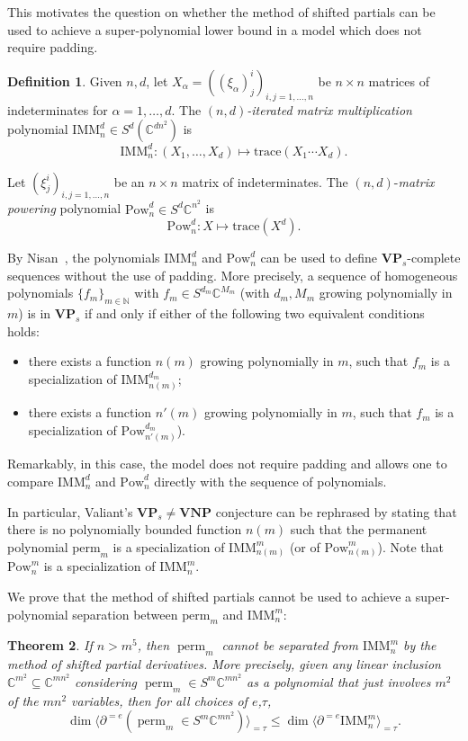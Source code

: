 \documentclass[11pt]{article}
\numberwithin{equation}{section}
\newtheorem{theorem}{Theorem}[section]
\theoremstyle{definition}
\newtheorem{definition}[theorem]{Definition}
\theoremstyle{plain}
\newcommand{\vvirg}{ , \dots , }
\newcommand{\bbC}{\mathbb{C}}
\newcommand{\bbN}{\mathbb{N}}
\newcommand{\bfVNP}{\mathbf{VNP}}
\newcommand{\bfVP}{\mathbf{VP}}
\newcommand{\perm}{\mathrm{perm}}
\newcommand{\Pow}{\mathrm{Pow}}
\newcommand{\trace}{\mathrm{trace}}
\def\BC{\mathbb C}
\def\t{\tau}
\def\tperm{\operatorname{perm}}
\def\tdim{\operatorname{dim}}
\newcommand{\IMM}{\mathrm{IMM}}
\begin{document}
This motivates the question on whether the method of shifted partials can be used to achieve a super-polynomial lower bound in a model which does not require padding.

\begin{definition}
Given $n,d$, let $X_\alpha = ((\xi_\alpha)^i_j)_{i,j = 1 \vvirg n}$ be $n \times n$ matrices of indeterminates for $\alpha = 1 \vvirg d$. The \emph{$(n,d)$-iterated matrix multiplication} polynomial $\IMM^d_n\in S^d(\BC^{dn^2})$ is 
\[
\IMM^d_n: (X_1\vvirg X_d)\mapsto \trace(X_1\cdots X_d).
\] 

Let $(\xi^i_j)_{i,j = 1 \vvirg n}$ be an $n\times n$ matrix of indeterminates. The $(n,d)$-\emph{matrix powering} polynomial $\Pow^d_n\in S^d\BC^{n^2}$ is
\[
 \Pow^d_n : X \mapsto \trace(X^d).
\]
\end{definition}

By %
Nisan~\cite{Nisan:1991:LBN:103418.103462},  %
the polynomials $\IMM^d_n$ and $\Pow^d_n$ can be used to define $\bfVP_s$-complete sequences without the use of padding. More precisely, a sequence of
homogeneous polynomials $\{ f_m \}_{m \in \bbN}$ with
$f_m \in S^{d_m} \bbC^{M_m}$ (with $d_m, M_m$ growing polynomially in $m$)
is in $\bfVP_s$ if and only if
%
%
%
%
%
%
%
%
either of the following two equivalent conditions holds:
\begin{itemize}
  \item there exists a function $n(m)$
%
growing polynomially in $m$, such that $f_m$ is
a specialization of $\IMM^{d_m}_{n(m)}$;
%
  \item there exists a function $n'(m)$
growing polynomially in $m$, such that $f_m$ is
a specialization of $\Pow^{d_m}_{n'(m)}$).
\end{itemize}
%
Remarkably, in this case, the model does not require padding and allows
one to compare $\IMM^d_n$ and $\Pow^d_n$ directly with the sequence of
polynomials.


In particular, Valiant's $\bfVP_s \neq \bfVNP$ conjecture can be rephrased by stating that there is no polynomially bounded function $n(m)$ such that the permanent polynomial $\perm_m$ is a specialization of $\IMM^m_{n(m)}$ (or of $\Pow^m_{n(m)}$). Note that $\Pow^m_n$ is a specialization of $\IMM^m_n$. 

We prove that the method of shifted partials cannot be used to achieve a super-polynomial separation between $\perm_m$ and $\IMM^m_n$: 

\begin{theorem}\label{noshiftthm}
  If $n> m^5$, then $\tperm_m$ cannot be separated from $\IMM^m_{n}$ by the method of shifted partial derivatives. More precisely, given any linear inclusion $\BC^{m^2}\subseteq \BC^{ {m} n^2}$ considering $\tperm_m\in S^m\BC^{ {m} n^2}$ as a polynomial that just involves $m^2$ of the $m n^2$ variables, then for all choices of $e$,$\t$,
  \[
    \tdim  \langle \partial^{=e}(\tperm_m\in S^m\BC^{ {m}n^2})\rangle_{=\t}\leq \tdim  \langle \partial^{=e}\IMM^m_n\rangle_{=\t}.
  \]
\end{theorem} 
\end{document}
